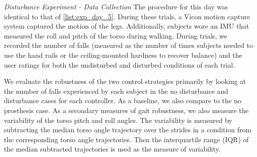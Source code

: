 \begin{days}
    \item\label{list:exp_day_6} \emph{Disturbance Experiment - Data Collection}
    The procedure for this day was identical to that of \cref{list:exp_day_5}.
    During these trials, a Vicon motion capture system captured the motion of
    the legs. Additionally, subjects wore an IMU that measured the roll and
    pitch of the torso during walking. During trials, we recorded the number of
    falls (measured as the number of times subjects needed to use the hand rails
    or the ceiling-mounted hardness to recover balance) and the user ratings for
    both the undisturbed and disturbed conditions of each trial. 
\end{days}

We evaluate the robustness of the two control strategies primarily by looking at
the number of falls experienced by each subject in the no disturbance and
disturbance cases for each controller. As a baseline, we also compare to the no
prosthesis case. As a secondary measures of gait robustness, we also measure the
variability of the torso pitch and roll angles. The variability is measured by
subtracting the median torso angle trajectory over the strides in a condition
from the corresponding torso angle trajectories. Then the interquartile range
(IQR) of the median subtracted trajectories is used as the measure of
variability.

